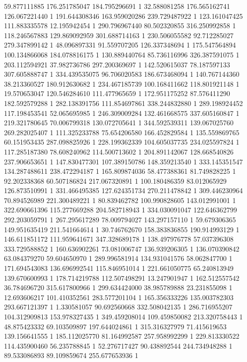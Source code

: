 59.877111885	176.251785047	184.795296691	1
32.588081258	176.565162741	126.067221440	1
191.644308346	163.959020286	239.729487922	1
123.161047425	111.883335578	12.195942454	1
290.796967440	80.502320855	316.250992858	1
118.246567883	129.869092959	301.688714163	1
230.506055582	92.712285027	279.347899142	1
48.096897331	91.559707205	126.337348694	1
175.547564894	100.134866068	184.078816175	1
130.889440764	85.736116996	326.387591075	1
203.112594921	37.982736786	297.200369697	1
142.520615037	78.187597133	307.605888747	1
334.439535075	96.706020583	186.673468094	1
140.767144360	38.213360527	180.912630682	1
234.467185739	100.168411662	118.801921148	1
19.570653047	120.546284610	111.477965659	1
172.951175252	87.576411290	182.592579288	1
282.138391756	111.854697861	338.244832880	1
289.198924452	117.198453541	52.065695985	1
246.309009284	132.461668575	337.605160847	1
219.321780645	70.006799318	130.072705641	1
344.592539311	139.067025760	269.282025407	1
111.325233788	75.654206580	166.452829584	1
135.559869765	60.151953435	287.098825926	1
228.199362339	104.605037735	234.025597824	1
117.285187380	78.608240962	114.500713602	1
204.891142067	128.668540826	237.906653651	1
147.830477301	107.389150786	148.359213540	1
333.145351547	134.287488611	238.472294187	1
165.809874036	58.477388361	81.749828225	1
92.202338368	60.507186824	217.067320891	1
100.180486359	83.012065929	126.873510991	1
331.466495385	127.624351734	270.211478842	1
309.446230964	70.894526989	221.300489221	1
80.839462782	100.990828605	143.012991001	1
322.690661396	115.277669288	204.582718943	1
334.030091047	122.646362799	292.203059791	1
267.295617289	78.009794027	143.297157110	1
59.679306365	149.951635419	211.541664614	1
30.746762670	158.383836855	190.914993129	1
146.611851172	111.959641671	347.328689178	1
138.497976778	57.037396308	333.729588852	1
160.636902261	73.081006747	136.939206305	1
136.070390842	63.084379270	59.604650970	1
289.996581914	134.931041576	58.062847700	1
171.694543083	136.696992541	115.846951014	1
221.661050775	65.240813949	139.670600993	1
178.714219788	112.507498291	13.247901947	1
162.512557542	36.784696720	315.617800966	1
299.634424000	38.985789888	23.231855098	1
12.693606217	101.410352561	283.577201104	1
165.356333226	135.003782303	293.667121397	1
1.330581057	90.692560668	332.508042135	1
286.716955207	104.312909813	153.978327435	1
349.459208014	109.459850082	213.320758443	1
48.875423332	69.103509897	197.644024861	1
315.316327979	71.415619653	139.156641555	1
185.112025770	81.164992587	257.958992299	1
229.813330522	114.435900460	56.235788845	1
52.276717427	90.438892544	244.734948288	1
89.533086893	89.109859674	255.677653936	1
